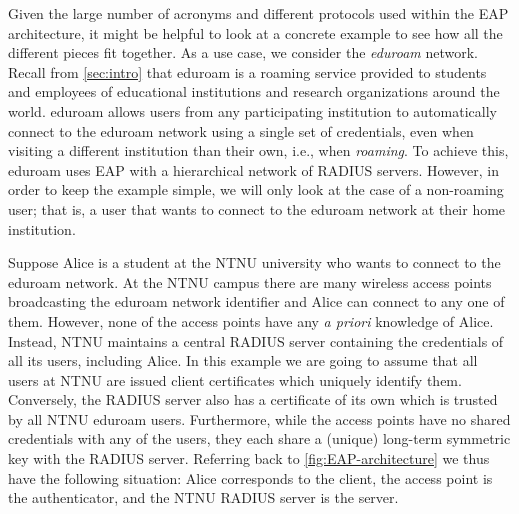 \begin{example}\label{example:eduroam}
Given the large number of acronyms and different protocols used within the EAP architecture,
it might be helpful to look at a concrete example to see how all the different pieces fit together.
As a use case, we consider the \emph{eduroam} network.
Recall from \cref{sec:intro} that eduroam is a roaming service provided to students and employees of educational institutions and research organizations around the world. 
eduroam allows users from any participating institution to automatically connect to the eduroam network using a single set of credentials,
even when visiting a different institution than their own,
i.e., when \emph{roaming}.
To achieve this,
eduroam uses EAP with a hierarchical network of RADIUS servers.
However,
in order to keep the example simple, we will only look at the case of a non-roaming user;
that is, a user that wants to connect to the eduroam network at their home institution.

Suppose Alice is a student at the NTNU university who wants to connect to the eduroam network. 
At the NTNU campus there are many wireless access points broadcasting the eduroam network identifier and Alice can connect to any one of them.
However,
none of the access points have any \emph{a priori} knowledge of Alice.
Instead, 
NTNU maintains a central RADIUS server containing the credentials of all its users, including Alice. 
In this example we are going to assume that all users at NTNU are issued client certificates which uniquely identify them.
Conversely,
the RADIUS server also has a certificate of its own which is trusted by all NTNU eduroam users.
Furthermore,
while the access points have no shared credentials with any of the users,
they each share a (unique) long-term symmetric key with the RADIUS server.
Referring back to \cref{fig:EAP-architecture} we thus have the following situation:
Alice corresponds to the client,
the access point is the authenticator,
and the NTNU RADIUS server is the server.


\end{example}
